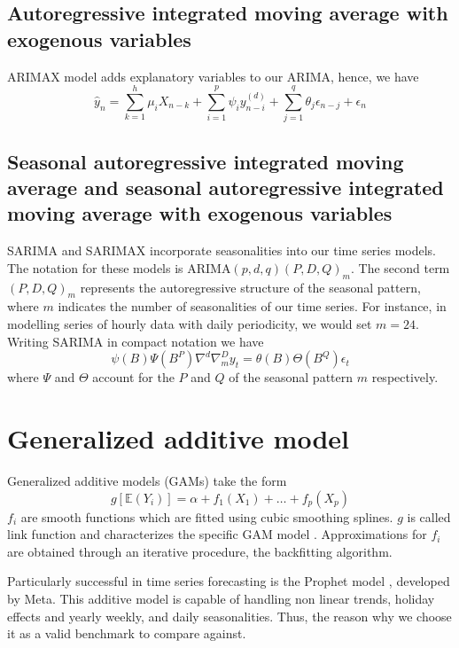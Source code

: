 \subsection{Autoregressive integrated moving average with exogenous variables}
ARIMAX model adds explanatory variables to our ARIMA, hence, we have
\begin{equation}
    \hat{y}_n=\sum\limits_{k=1}^{h} \mu_i X_{n-k}+\sum\limits_{i=1}^{p}\psi_i y_{n-i}^{(d)}+\sum\limits_{j=1}^{q}\theta_j \epsilon_{n-j}+ \epsilon_{n}
\end{equation}
\subsection{Seasonal autoregressive integrated moving average and seasonal autoregressive integrated moving average with exogenous variables}
SARIMA and SARIMAX incorporate seasonalities into our time series models. The notation for these models is ARIMA$(p,d,q)(P,D,Q)_m$. The second term $(P,D,Q)_m$ represents the autoregressive structure of the seasonal pattern, where $m$ indicates the number of seasonalities of our time series.
For instance, in modelling series of hourly data with daily periodicity, we would set $m=24$.
Writing SARIMA in compact notation we have
\\
\begin{equation}
    \psi(B)\Psi(B^P)\nabla^d\nabla_m^Dy_t=\theta(B)\Theta(B^Q)\epsilon_t
\end{equation}
where $\Psi$ and $\Theta$ account for the $P$ and $Q$ of the seasonal pattern $m$ respectively.
\section{Generalized additive model}
Generalized additive models (GAMs) take the form
\begin{equation}
    g[\mathbb{E}(Y_i)]=\alpha+f_1(X_1)+\dots+f_p(X_p)
\end{equation}
$f_i$ are smooth functions which are fitted using cubic smoothing splines.
$g$ is called link function and characterizes the specific GAM model \cite{hastie2017generalized}. Approximations for $f_i$ are obtained through an iterative procedure, the backfitting algorithm.

Particularly successful in time series forecasting is the Prophet model \cite{taylor2018forecasting}, developed by Meta. This additive model is capable of handling non linear trends, holiday effects and yearly weekly, and daily seasonalities. Thus, the reason why we choose it as a valid benchmark to compare against.
